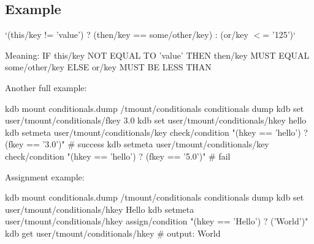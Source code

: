 \subsection*{Example}

`(this/key != 'value') ? (then/key == some/other/key) \+: (or/key $<$= '125')`

Meaning\+: I\+F {\ttfamily this/key} N\+O\+T E\+Q\+U\+A\+L T\+O {\ttfamily 'value'} T\+H\+E\+N {\ttfamily then/key} M\+U\+S\+T E\+Q\+U\+A\+L {\ttfamily some/other/key} E\+L\+S\+E {\ttfamily or/key} M\+U\+S\+T B\+E L\+E\+S\+S T\+H\+A\+N {}

Another full example\+: \begin{DoxyVerb}    kdb mount conditionals.dump /tmount/conditionals conditionals dump
    kdb set user/tmount/conditionals/fkey 3.0
    kdb set user/tmount/conditionals/hkey hello
    kdb setmeta user/tmount/conditionals/key check/condition "(hkey == 'hello') ? (fkey == '3.0')" # success
    kdb setmeta user/tmount/conditionals/key check/condition "(hkey == 'hello') ? (fkey == '5.0')" # fail
\end{DoxyVerb}


Assignment example\+: \begin{DoxyVerb}    kdb mount conditionals.dump /tmount/conditionals conditionals dump
    kdb set user/tmount/conditionals/hkey Hello
    kdb setmeta user/tmount/conditionals/hkey assign/condition "(hkey == 'Hello') ? ('World')"
    kdb get user/tmount/conditionals/hkey # output: World\end{DoxyVerb}
 